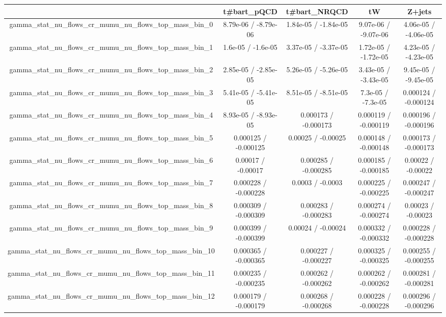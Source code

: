 \documentclass[10pt]{article}
\begin{document}
\begin{table}[htbp]
\begin{center}
\begin{tabular}{|c|c|c|c|c|}
\hline 
      & t#bar{t}_{pQCD}      & t#bar{t}_{NRQCD}      & tW      & Z+jets \\ 
\hline 
  gamma_stat_nu_flows_cr_mumu_nu_flows_top_mass_bin_0 & 8.79e-06 / -8.79e-06 & 1.84e-05 / -1.84e-05 & 9.07e-06 / -9.07e-06 & 4.06e-05 / -4.06e-05 \\ 
  gamma_stat_nu_flows_cr_mumu_nu_flows_top_mass_bin_1 & 1.6e-05 / -1.6e-05 & 3.37e-05 / -3.37e-05 & 1.72e-05 / -1.72e-05 & 4.23e-05 / -4.23e-05 \\ 
  gamma_stat_nu_flows_cr_mumu_nu_flows_top_mass_bin_2 & 2.85e-05 / -2.85e-05 & 5.26e-05 / -5.26e-05 & 3.43e-05 / -3.43e-05 & 9.45e-05 / -9.45e-05 \\ 
  gamma_stat_nu_flows_cr_mumu_nu_flows_top_mass_bin_3 & 5.41e-05 / -5.41e-05 & 8.51e-05 / -8.51e-05 & 7.3e-05 / -7.3e-05 & 0.000124 / -0.000124 \\ 
  gamma_stat_nu_flows_cr_mumu_nu_flows_top_mass_bin_4 & 8.93e-05 / -8.93e-05 & 0.000173 / -0.000173 & 0.000119 / -0.000119 & 0.000196 / -0.000196 \\ 
  gamma_stat_nu_flows_cr_mumu_nu_flows_top_mass_bin_5 & 0.000125 / -0.000125 & 0.00025 / -0.00025 & 0.000148 / -0.000148 & 0.000173 / -0.000173 \\ 
  gamma_stat_nu_flows_cr_mumu_nu_flows_top_mass_bin_6 & 0.00017 / -0.00017 & 0.000285 / -0.000285 & 0.000185 / -0.000185 & 0.00022 / -0.00022 \\ 
  gamma_stat_nu_flows_cr_mumu_nu_flows_top_mass_bin_7 & 0.000228 / -0.000228 & 0.0003 / -0.0003 & 0.000225 / -0.000225 & 0.000247 / -0.000247 \\ 
  gamma_stat_nu_flows_cr_mumu_nu_flows_top_mass_bin_8 & 0.000309 / -0.000309 & 0.000283 / -0.000283 & 0.000274 / -0.000274 & 0.00023 / -0.00023 \\ 
  gamma_stat_nu_flows_cr_mumu_nu_flows_top_mass_bin_9 & 0.000399 / -0.000399 & 0.00024 / -0.00024 & 0.000332 / -0.000332 & 0.000228 / -0.000228 \\ 
  gamma_stat_nu_flows_cr_mumu_nu_flows_top_mass_bin_10 & 0.000365 / -0.000365 & 0.000227 / -0.000227 & 0.000325 / -0.000325 & 0.000255 / -0.000255 \\ 
  gamma_stat_nu_flows_cr_mumu_nu_flows_top_mass_bin_11 & 0.000235 / -0.000235 & 0.000262 / -0.000262 & 0.000262 / -0.000262 & 0.000281 / -0.000281 \\ 
  gamma_stat_nu_flows_cr_mumu_nu_flows_top_mass_bin_12 & 0.000179 / -0.000179 & 0.000268 / -0.000268 & 0.000228 / -0.000228 & 0.000296 / -0.000296 \\ 

\end{tabular}
\end{center}
\end{table}
\end{document}
